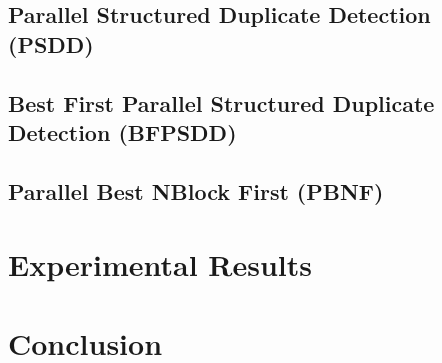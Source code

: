 \documentclass{article}
\begin{document}
\subsection{Parallel Structured Duplicate Detection (PSDD)}
\cite{zhou:psd}
\subsection{Best First Parallel Structured Duplicate Detection (BFPSDD)}
\cite{zhou:sdd}
\subsection{Parallel Best NBlock First (PBNF)}
\section{Experimental Results}
\section{Conclusion}



\end{document}
